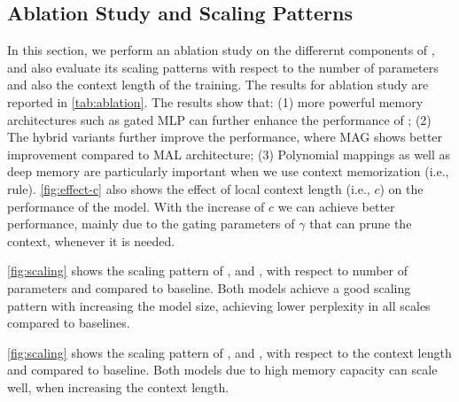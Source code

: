 \subsection{Ablation Study and Scaling Patterns}
In this section, we perform an ablation study on the differernt components of \model, and also evaluate its scaling patterns with respect to the number of parameters and also the context length of the training. The results for ablation study are reported in \autoref{tab:ablation}. The results show that: (1) more powerful memory architectures such as gated MLP can further enhance the performance of \model; (2) The hybrid variants further improve the performance, where MAG shows better improvement compared to MAL architecture; (3) Polynomial mappings as well as deep memory are particularly important when we use context memorization (i.e., \learningrule{} rule). \autoref{fig:effect-c} also shows the effect of local context length (i.e., $c$) on the performance of the model. With the increase of $c$ we can achieve better performance, mainly due to the gating parameters of $\gamma$ that can prune the context, whenever it is needed. 





\autoref{fig:scaling} shows the scaling pattern of \model, and \omodel, with respect to number of parameters and compared to baseline. Both models achieve a good scaling pattern with increasing the model size, achieving lower perplexity in all scales compared to baselines. 




\autoref{fig:scaling} shows the scaling pattern of \model, and \omodel, with respect to the context length and compared to baseline. Both models due to high memory capacity can scale well, when increasing the context length. 



